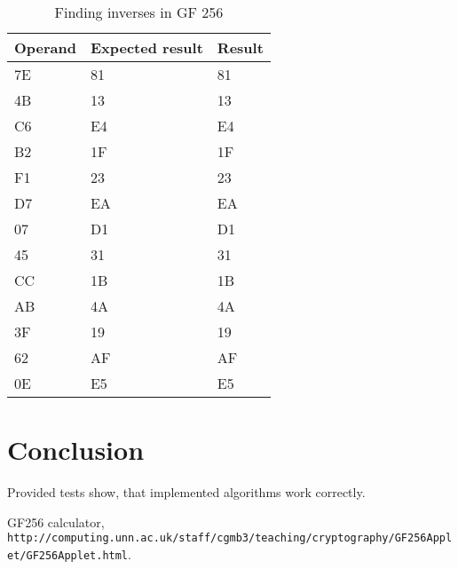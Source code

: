 \documentclass[5pt]{article}
\begin{document}
\begin{table}[ht]
  \centering
  \caption{Finding inverses in GF 256}
  \begin{tabular}{|l|l|l|}
  \hline
  Operand &  Expected result & Result\\
  \hline
  \hline
  
  7E & 81 & 81 \\
  \hline
4B & 13 & 13\\
\hline
C6 & E4 & E4\\
\hline
B2 & 1F & 1F \\
\hline
F1 & 23 & 23\\
\hline 	
D7 & EA & EA \\
\hline 	
07& D1 &	D1\\
\hline 	
45&  31 &	31\\
\hline 	
CC&  1B &	1B\\
\hline
AB & 4A & 4A \\
\hline 	
3F& 19 & 19\\
\hline 	
62& AF &	AF\\
\hline 	
0E & E5 &	E5\\
\hline


  \end{tabular}
  \label{tab:inverses}
\end{table}


\section{Conclusion}
Provided tests show, that implemented algorithms work
correctly.

\begin{thebibliography}{1}

GF256 calculator,\newline
\verb|http://computing.unn.ac.uk/staff/cgmb3/teaching/cryptography/GF256Applet/GF256Applet.html|.

\end{thebibliography}
\end{document}
